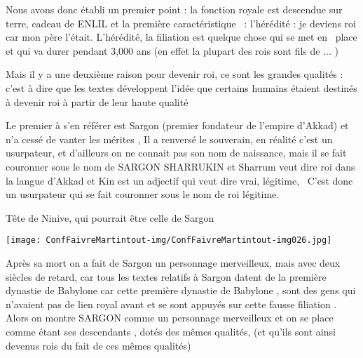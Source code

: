 \documentclass[a4paper]{article}
\begin{document}
\bigskip


\bigskip

{
Nous avons donc établi un premier point : la fonction royale est
descendue sur terre, cadeau de ENLIL et la première caractéristique \ :
l'hérédité : je deviens roi car mon père l'était. L'hérédité, la
filiation est quelque chose qui se met en \ place et qui va durer
pendant 3,000 ans (en effet la plupart des rois sont fils de ... )}


\bigskip

{
Mais il y a une deuxième raison pour devenir roi, ce sont les grandes
qualités : c'est à dire que les textes développent l'idée que certains
humains étaient destinés à devenir roi à partir de leur haute qualité }

{
Le premier à s'en référer est Sargon (premier fondateur de l'empire
d'Akkad) et n'a cessé de vanter les mérites , Il a renversé le
souverain, en réalité c'est un usurpateur, et d'ailleurs on ne connait
pas son nom de naissance, mais il se fait couronner sous le nom de
SARGON SHARRUKIN et Sharrum veut dire roi dans la langue d'Akkad et Kin
est un adjectif qui veut dire vrai, légitime, \ C'est donc un
usurpateur qui se fait couronner sous le nom de roi légitime.}


\bigskip

{
Tête de Ninive, qui pourrait être celle de Sargon}


\bigskip


\bigskip


\texttt{[image: ConfFaivreMartintout-img/ConfFaivreMartintout-img026.jpg]}



\bigskip


\bigskip

{
Après sa mort on a fait de Sargon un personnage merveilleux, mais avec
deux siècles de retard, car tous les textes relatifs à Sargon datent de
la première dynastie de Babylone car cette première dynastie de
Babylone , sont des gens qui n'avaient pas de lien royal avant et se
sont appuyés sur cette fausse filiation . Alors on montre SARGON comme
un personnage merveilleux et on se place comme étant ses descendants ,
dotés des mêmes qualités, (et qu'ils sont ainsi devenus rois du fait de
ces mêmes qualités)}


\bigskip


\bigskip
\end{document}
